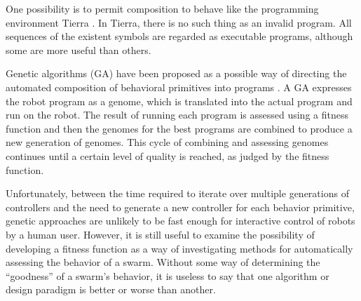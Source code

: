 \documentclass[]{article}
\begin{document}
One possibility is to permit composition to behave like the programming environment Tierra \cite{ray1991approach}.
In Tierra, there is no such thing as an invalid program. 
All sequences of the existent symbols are regarded as executable programs, although some are more useful than others. 

Genetic algorithms (GA) have been proposed as a possible way of directing the automated composition of behavioral primitives into programs \cite{palmer2005emergence}.
A GA expresses the robot program as a genome, which is translated into the actual program and run on the robot. 
The result of running each program is assessed using a fitness function and then the genomes for the best programs are combined to produce a new generation of genomes. 
This cycle of combining and assessing genomes continues until a certain level of quality is reached, as judged by the fitness function.

Unfortunately, between the time required to iterate over multiple generations of controllers and the need to generate a new controller for each behavior primitive, genetic approaches are unlikely to be fast enough for interactive control of robots by a human user. 
However, it is still useful to examine the possibility of developing a fitness function as a way of investigating methods for automatically assessing the behavior of a swarm.
Without some way of determining the ``goodness'' of a swarm's behavior, it is useless to say that one algorithm or design paradigm is better or worse than another. 
\end{document}
